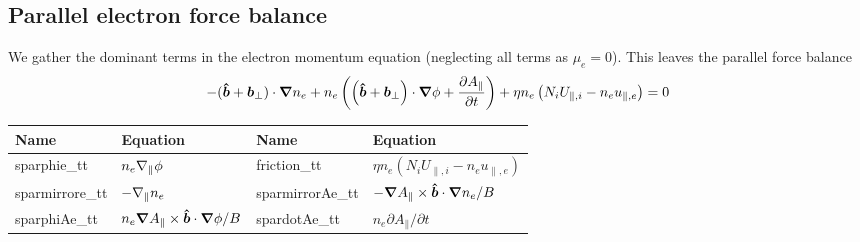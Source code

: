\subsection{Parallel electron force balance}
We gather the dominant terms in the electron momentum equation (neglecting all terms as $\mu_e=0$). This leaves the parallel force balance
\begin{align}
    -(\bm{\hat{b}} + {\boldsymbol{b}}_\perp) \cdot{\boldsymbol{\nabla}} n_e +n_e\left( \left( \bm{\hat{b}} + {\boldsymbol{b}}_\perp \right) \cdot{\boldsymbol{\nabla}} \phi + \frac{\partial A_\parallel}{\partial t} \right) +\eta n_e \left( N_iU_{\parallel,i} - n_eu_{\parallel,e}\right) = 0
\end{align}
\begin{longtable}{llll}
\toprule
\rowcolor{gray!50}\textbf{Name} &  \textbf{Equation} &
\textbf{Name} &  \textbf{Equation}\\
\midrule
    sparphie\_tt & $n_e\nabla_\parallel \phi$ &
    friction\_tt & $ \eta n_e(N_iU_{\parallel,i}-n_eu_{\parallel,e})$ \\
    sparmirrore\_tt & $-\nabla_\parallel n_e$ &
    sparmirrorAe\_tt & $-{\boldsymbol{\nabla}} A_\parallel \times \bm{\hat{b}} \cdot{\boldsymbol{\nabla}} n_e /B$ \\
    sparphiAe\_tt & $n_e {\boldsymbol{\nabla}} A_\parallel \times \bm{\hat{b}} \cdot{\boldsymbol{\nabla}} \phi /B$ &
    spardotAe\_tt & $ n_e \partial A_\parallel /\partial t$ \\
\bottomrule
\end{longtable}





